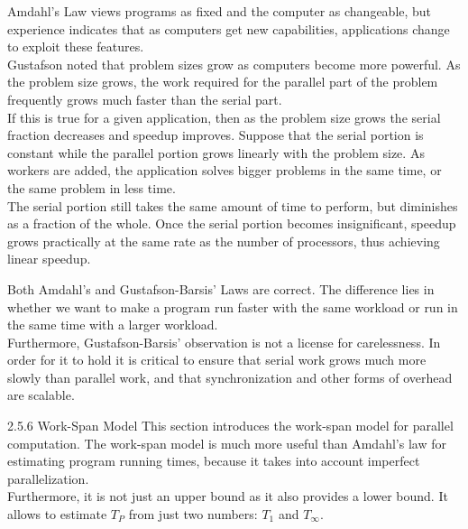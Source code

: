 Amdahl's Law views programs as fixed and the computer as changeable, but experience indicates
that as computers get new capabilities, applications change to exploit these features.\\
Gustafson noted that problem sizes grow as computers become more powerful. As the problem
size grows, the work required for the parallel part of the problem frequently grows much faster than
the serial part.\\
If this is true for a given application, then as the problem size grows the serial fraction decreases and speedup improves.
Suppose that the serial portion is constant while the parallel portion grows linearly with the problem size. As workers are added, the application solves bigger problems in the same time, or the same problem in less time.\\
The serial portion still takes the same amount of time to perform, but diminishes as a fraction of the whole. Once the serial portion becomes insignificant, speedup grows practically at the same rate as the number of processors, thus achieving linear speedup.

Both Amdahl’s and Gustafson-Barsis’ Laws are correct. The difference lies in whether we want to make a program run faster with the same
workload or run in the same time with a larger workload.\\
Furthermore, Gustafson-Barsis’ observation is not a license for carelessness. In order for it to
hold it is critical to ensure that serial work grows much more slowly than parallel work, and that
synchronization and other forms of overhead are scalable.


2.5.6 Work-Span Model
This section introduces the work-span model for parallel computation. The work-span model is much
more useful than Amdahl’s law for estimating program running times, because it takes into account
imperfect parallelization. \\
Furthermore, it is not just an upper bound as it also provides a lower bound.
It allows to estimate \(T_{P}\) from just two numbers: \(T_{1}\) and \(T_{\infty}\).


